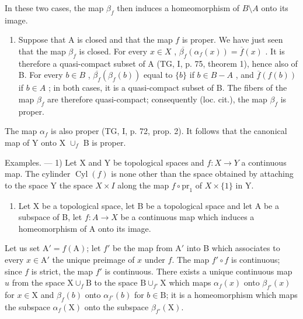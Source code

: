 In these two cases, the map \(\beta_{f}\) then induces a homeomorphism of \(B\setminus A\) onto its image.

\begin{enumerate}
\def\labelenumi{\arabic{enumi})}
\setcounter{enumi}{2}
\tightlist
\item
  Suppose that A is closed and that the map \(f\) is proper. We have just seen that the map \(\beta_f\) is closed. For every \(x \in X\) , \(\overline{\beta_f}(\alpha_f(x)) = \overline{f}(x)\) . It is therefore a quasi-compact subset of A (TG, I, p. 75, theorem 1), hence also of B. For every \(b \in B\) , \(\overline{\beta_f}(\beta_f(b))\) equal to \(\{b\}\) if \(b \in B - A\) , and \(\overline{f}(f(b))\) if \(b \in A\) ; in both cases, it is a quasi-compact subset of B. The fibers of the map \(\beta_{f}\) are therefore quasi-compact; consequently (loc. cit.), the map \(\beta_{f}\) is proper.
\end{enumerate}

The map \(\alpha_{f}\) is also proper (TG, I, p. 72, prop. 2). It follows that the canonical map of Y onto X \(\cup_{f}\) B is proper.

Examples. --- 1) Let X and Y be topological spaces and \(f\colon X\to Y\) a continuous map. The cylinder \(\operatorname{Cyl}(f)\) is none other than the space obtained by attaching to the space Y the space \(X\times I\) along the map \(f\circ \mathrm{pr}_1\) of \(X\times \{1\}\) in Y.

\begin{enumerate}
\def\labelenumi{\arabic{enumi})}
\setcounter{enumi}{1}
\tightlist
\item
  Let X be a topological space, let B be a topological space and let A be a subspace of B, let \(f: A \to X\) be a continuous map which induces a homeomorphism of A onto its image.
\end{enumerate}

Let us set \(\mathrm{A}' = f(\mathrm{A})\); let \(f'\) be the map from \(\mathrm{A}'\) into B which associates to every \(x \in \mathrm{A}'\) the unique preimage of \(x\) under \(f\). The map \(f' \circ f\) is continuous; since \(f\) is strict, the map \(f'\) is continuous. There exists a unique continuous map \(u\) from the space \(\mathrm{X} \cup_f \mathrm{B}\) to the space \(\mathrm{B} \cup_{f'} \mathrm{X}\) which maps \(\alpha_f(x)\) onto \(\beta_{f'}(x)\) for \(x \in \mathrm{X}\) and \(\beta_f(b)\) onto \(\alpha_{f'}(b)\) for \(b \in \mathrm{B}\); it is a homeomorphism which maps the subspace \(\alpha_f(\mathrm{X})\) onto the subspace \(\beta_{f'}(\mathrm{X})\).

